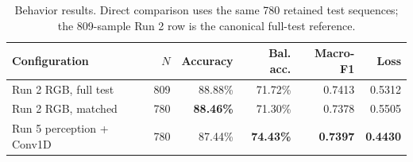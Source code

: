 \begin{table}[htbp]
\centering\small
\caption[Behavior RGB and cattle-centered temporal comparison]{Behavior results. Direct comparison uses the same 780 retained test sequences; the 809-sample Run 2 row is the canonical full-test reference.}
\label{tab:behaviorcomparison}
\begin{tabular}{lrrrrr}
\toprule
Configuration & $N$ & Accuracy & Bal. acc. & Macro-F1 & Loss \\
\midrule
Run 2 RGB, full test & 809 & 88.88\% & 71.72\% & 0.7413 & 0.5312 \\
Run 2 RGB, matched & 780 & \textbf{88.46\%} & 71.30\% & 0.7378 & 0.5505 \\
Run 5 perception + Conv1D & 780 & 87.44\% & \textbf{74.43\%} & \textbf{0.7397} & \textbf{0.4430} \\
\bottomrule
\end{tabular}
\end{table}

